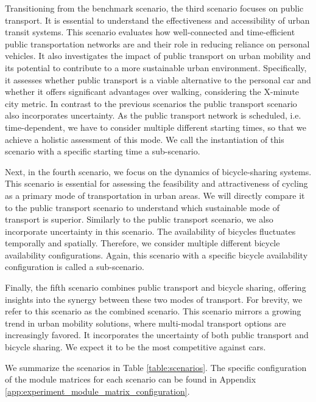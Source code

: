 Transitioning from the benchmark scenario, the third scenario focuses on public transport. 
It is essential to understand the effectiveness and accessibility of urban transit systems. 
This scenario evaluates how well-connected and time-efficient public transportation networks are and their role in reducing reliance on personal vehicles. 
It also investigates the impact of public transport on urban mobility and its potential to contribute to a more sustainable urban environment. 
Specifically, it assesses whether public transport is a viable alternative to the personal car and whether it offers significant advantages over walking, considering the X-minute city metric.
In contrast to the previous scenarios the public transport scenario also incorporates uncertainty.
As the public transport network is scheduled, i.e. time-dependent, we have to consider multiple different starting times, so that we achieve a holistic assessment of this mode.
We call the instantiation of this scenario with a specific starting time a sub-scenario.

Next, in the fourth scenario, we focus on the dynamics of bicycle-sharing systems. 
This scenario is essential for assessing the feasibility and attractiveness of cycling as a primary mode of transportation in urban areas. 
We will directly compare it to the public transport scenario to understand which sustainable mode of transport is superior.
Similarly to the public transport scenario, we also incorporate uncertainty in this scenario.
The availability of bicycles fluctuates temporally and spatially.
Therefore, we consider multiple different bicycle availability configurations.
Again, this scenario with a specific bicycle availability configuration is called a sub-scenario.

Finally, the fifth scenario combines public transport and bicycle sharing, offering insights into the synergy between these two modes of transport.
For brevity, we refer to this scenario as the combined scenario.
This scenario mirrors a growing trend in urban mobility solutions, where multi-modal transport options are increasingly favored. 
It incorporates the uncertainty of both public transport and bicycle sharing.
We expect it to be the most competitive against cars.

We summarize the scenarios in Table \ref{table:scenarios}.
The specific configuration of the module matrices for each scenario can be found in Appendix \ref{app:experiment_module_matrix_configuration}.

